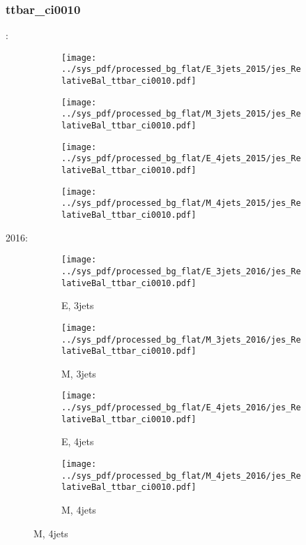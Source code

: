 \documentclass{beamer}
\begin{document}
\begin{frame}
\frametitle{ttbar_ci0010}
\fontsize{5}{1}:
\begin{figure}
\centering
\begin{subfigure}[b]{0.24\textwidth}
\texttt{[image: ../sys\_pdf/processed\_bg\_flat/E\_3jets\_2015/jes\_RelativeBal\_ttbar\_ci0010.pdf]}
\end{subfigure}
\begin{subfigure}[b]{0.24\textwidth}
\texttt{[image: ../sys\_pdf/processed\_bg\_flat/M\_3jets\_2015/jes\_RelativeBal\_ttbar\_ci0010.pdf]}
\end{subfigure}
\begin{subfigure}[b]{0.24\textwidth}
\texttt{[image: ../sys\_pdf/processed\_bg\_flat/E\_4jets\_2015/jes\_RelativeBal\_ttbar\_ci0010.pdf]}
\end{subfigure}
\begin{subfigure}[b]{0.24\textwidth}
\texttt{[image: ../sys\_pdf/processed\_bg\_flat/M\_4jets\_2015/jes\_RelativeBal\_ttbar\_ci0010.pdf]}
\end{subfigure}
\end{figure}
2016:
\begin{figure}
\centering
\begin{subfigure}[b]{0.24\textwidth}
\texttt{[image: ../sys\_pdf/processed\_bg\_flat/E\_3jets\_2016/jes\_RelativeBal\_ttbar\_ci0010.pdf]}
\captionsetup{font=tiny}
\caption{E, 3jets}
\end{subfigure}
\begin{subfigure}[b]{0.24\textwidth}
\texttt{[image: ../sys\_pdf/processed\_bg\_flat/M\_3jets\_2016/jes\_RelativeBal\_ttbar\_ci0010.pdf]}
\captionsetup{font=tiny}
\caption{M, 3jets}
\end{subfigure}
\begin{subfigure}[b]{0.24\textwidth}
\texttt{[image: ../sys\_pdf/processed\_bg\_flat/E\_4jets\_2016/jes\_RelativeBal\_ttbar\_ci0010.pdf]}
\captionsetup{font=tiny}
\caption{E, 4jets}
\end{subfigure}
\begin{subfigure}[b]{0.24\textwidth}
\texttt{[image: ../sys\_pdf/processed\_bg\_flat/M\_4jets\_2016/jes\_RelativeBal\_ttbar\_ci0010.pdf]}
\captionsetup{font=tiny}
\caption{M, 4jets}
\end{subfigure}
\end{figure}
\end{frame}
\end{document}
